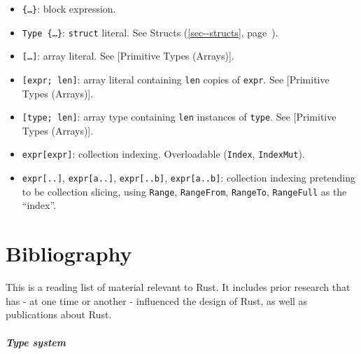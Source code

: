 \documentclass[a4paper,]{book}
\renewcommand*{\hypertarget}[3][\ar]{%
  \def\ar{#2}%
  \label{#1}%
  #3}
\renewcommand*{\hyperlink}[2]{%
 #2 (\autoref{#1}, page~\pageref{#1})}
\providecommand{\tightlist}{%
  \setlength{\itemsep}{0pt}\setlength{\parskip}{0pt}}
\let\oldparagraph\paragraph
\renewcommand{\paragraph}[1]{\oldparagraph{#1}\mbox{}}
\begin{document}
\begin{itemize}
\tightlist
\item
  \texttt{\{\ldots{}\}}: block expression.
\item
  \texttt{Type\ \{\ldots{}\}}: \texttt{struct} literal. See
  \protect\hyperlink{sec--structs}{Structs}.
\end{itemize}

\begin{itemize}
\tightlist
\item
  \texttt{{[}\ldots{}{]}}: array literal. See {[}Primitive Types
  (Arrays){]}.
\item
  \texttt{{[}expr;\ len{]}}: array literal containing \texttt{len}
  copies of \texttt{expr}. See {[}Primitive Types (Arrays){]}.
\item
  \texttt{{[}type;\ len{]}}: array type containing \texttt{len}
  instances of \texttt{type}. See {[}Primitive Types (Arrays){]}.
\item
  \texttt{expr{[}expr{]}}: collection indexing. Overloadable
  (\texttt{Index}, \texttt{IndexMut}).
\item
  \texttt{expr{[}..{]}}, \texttt{expr{[}a..{]}}, \texttt{expr{[}..b{]}},
  \texttt{expr{[}a..b{]}}: collection indexing pretending to be
  collection slicing, using \texttt{Range}, \texttt{RangeFrom},
  \texttt{RangeTo}, \texttt{RangeFull} as the ``index''.
\end{itemize}

\hypertarget{sec--bibliography}{\chapter{Bibliography}\label{sec--bibliography}}

This is a reading list of material relevant to Rust. It includes prior
research that has - at one time or another - influenced the design of
Rust, as well as publications about Rust.

\paragraph{Type system}\label{type-system}
\end{document}
